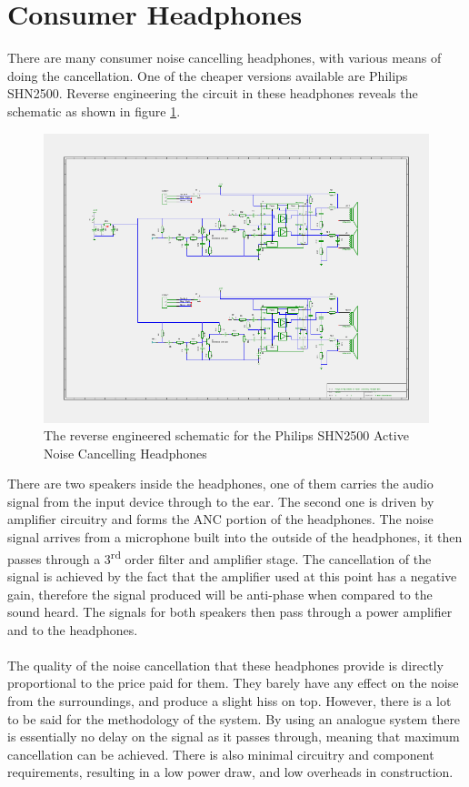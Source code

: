 \section{Consumer Headphones}
There are many consumer noise cancelling headphones, with various means of doing the cancellation.
One of the cheaper versions available are Philips SHN2500.
Reverse engineering the circuit in these headphones reveals the schematic as shown in figure \ref{fig:philipsphonessche}.

\begin{figure}[h]
	\centering
	\includegraphics[width=\textwidth]{./img/hp.png}
	\caption{The reverse engineered schematic for the Philips SHN2500 Active Noise Cancelling Headphones}
	\label{fig:philipsphonessche}
\end{figure}

\noindent
There are two speakers inside the headphones, one of them carries the audio signal from the input device through to the ear.
The second one is driven by amplifier circuitry and forms the ANC portion of the headphones.
The noise signal arrives from a microphone built into the outside of the headphones, it then passes through a 3\textsuperscript{rd} order filter and amplifier stage.
The cancellation of the signal is achieved by the fact that the amplifier used at this point has a negative gain, therefore the signal produced will be anti-phase when compared to the sound heard.
The signals for both speakers then pass through a power amplifier and to the headphones.
\\
\\
The quality of the noise cancellation that these headphones provide is directly proportional to the price paid for them. They barely have any effect on the noise from the surroundings, and produce a slight hiss on top.
However, there is a lot to be said for the methodology of the system. By using an analogue system there is essentially no delay on the signal as it passes through, meaning that maximum cancellation can be achieved.
There is also minimal circuitry and component requirements, resulting in a low power draw, and low overheads in construction.
